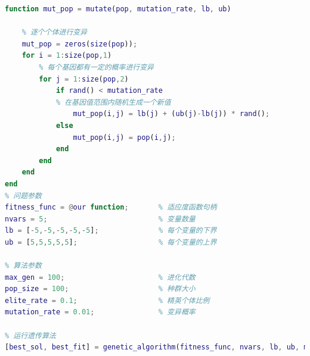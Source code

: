 \documentclass{MathorCupmodeling}
\begin{document}
\begin{lstlisting}[language=Matlab]
% 变异
function mut_pop = mutate(pop, mutation_rate, lb, ub)

    % 逐个个体进行变异
    mut_pop = zeros(size(pop));
    for i = 1:size(pop,1)
        % 每个基因都有一定的概率进行变异
        for j = 1:size(pop,2)
            if rand() < mutation_rate
            % 在基因值范围内随机生成一个新值
            	mut_pop(i,j) = lb(j) + (ub(j)-lb(j)) * rand();
        	else
            	mut_pop(i,j) = pop(i,j);
        	end
    	end
	end
end
% 问题参数
fitness_func = @our function;  		% 适应度函数句柄
nvars = 5;                          % 变量数量
lb = [-5,-5,-5,-5,-5];              % 每个变量的下界
ub = [5,5,5,5,5];                   % 每个变量的上界

% 算法参数
max_gen = 100;                      % 进化代数
pop_size = 100;                     % 种群大小
elite_rate = 0.1;                   % 精英个体比例
mutation_rate = 0.01;               % 变异概率

% 运行遗传算法
[best_sol, best_fit] = genetic_algorithm(fitness_func, nvars, lb, ub, max_gen, pop_size, elite_rate, mutation_rate);
\end{lstlisting}
\end{document}
